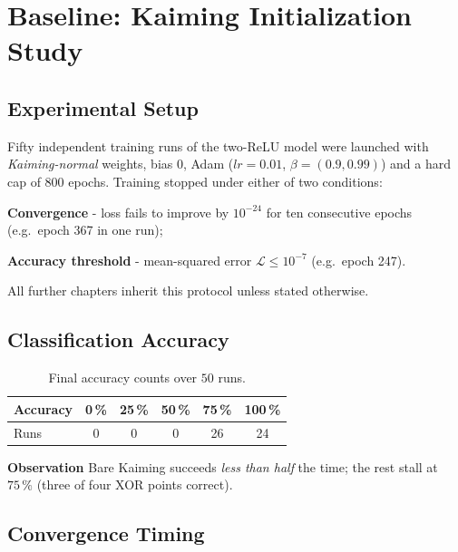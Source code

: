 
\section{Baseline: Kaiming Initialization Study}
\label{sec:relu1-kaiming}

\subsection*{Experimental Setup}
Fifty independent training runs of the two-ReLU model were launched with
\emph{Kaiming-normal} weights, bias $0$, Adam
($lr=0.01$, $\beta=(0.9,0.99)$) and a hard cap of $800$ epochs.
Training stopped under either of two conditions:
\begin{enumerate*}[label=(\roman*)]
    \item \textbf{Convergence} - loss fails to improve by
          $10^{-24}$ for ten consecutive epochs
          (e.g.\ epoch 367 in one run);
    \item \textbf{Accuracy threshold} - mean-squared error
          $\mathcal L\le10^{-7}$ (e.g.\ epoch 247).
\end{enumerate*}
All further chapters inherit this protocol unless stated otherwise.

\subsection*{Classification Accuracy}

\begin{table}[h]
\centering
\caption{Final accuracy counts over $50$ runs.}
\label{tab:relu1-kaiming-accuracy}
\begin{tabular}{lccccc}
\toprule
Accuracy & 0\,\% & 25\,\% & 50\,\% & 75\,\% & 100\,\% \\ \midrule
Runs & 0 & 0 & 0 & 26 & 24 \\ \bottomrule
\end{tabular}
\end{table}

\textbf{Observation}  
Bare Kaiming succeeds \emph{less than half} the time; the rest stall at
$75\,\%$ (three of four XOR points correct).

\subsection*{Convergence Timing}

